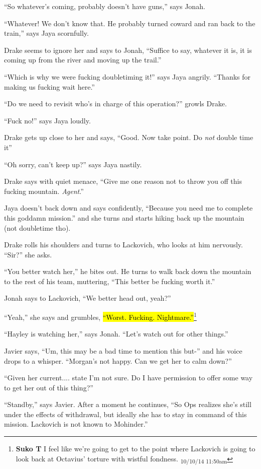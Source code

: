 ``So whatever's coming, probably doesn't have guns,'' says Jonah.

``Whatever!  We don't know that.  He probably turned coward and ran back to the train,'' says Jaya scornfully.

Drake seems to ignore her and says to Jonah, ``Suffice to say, whatever it is, it is coming up from the river and moving up the trail.''

``Which is why we were fucking doubletiming it!'' says Jaya angrily.  ``Thanks for making us fucking wait here.''

``Do we need to revisit who's in charge of this operation?'' growls Drake.

``Fuck no!'' says Jaya loudly.

Drake gets up close to her and says, ``Good.  Now take point.  Do \textit{not} double time it''

``Oh sorry, can't keep up?'' says Jaya nastily.

Drake says with quiet menace, ``Give me one reason not to throw you off this fucking mountain.  \textit{Agent}.''

Jaya doesn't back down and says confidently, ``Because you need me to complete this goddamn mission.'' and she turns and starts hiking back up the mountain (not doubletime tho).

Drake rolls his shoulders and turns to Lackovich, who looks at him nervously.  ``Sir?'' she asks.

``You better watch her,'' he bites out.  He turns to walk back down the mountain to the rest of his team, muttering, ``This better be fucking worth it.''

Jonah says to Lackovich, ``We better head out, yeah?''

``Yeah,'' she says and grumbles, \hl{``Worst.  Fucking.  Nightmare.''}\footnote{\textbf{Suko T }I feel like we're going to get to the point where Lackovich is going to look back at Octavius' torture with wistful fondness. \textsubscript{10/10/14 11:50am}}

``Hayley is watching her,'' says Jonah.  ``Let's watch out for other things.''

Javier says, ``Um, this may be a bad time to mention this but-'' and his voice drops to a whisper. ``Morgan's not happy.  Can we get her to calm down?''

``Given her current.... state I'm not sure.  Do I have permission to offer some way to get her out of this thing?''

``Standby,'' says Javier.  After a moment he continues, ``So Ops realizes she's still under the effects of withdrawal, but ideally she has to stay in command of this mission.  Lackovich is not known to Mohinder.''

